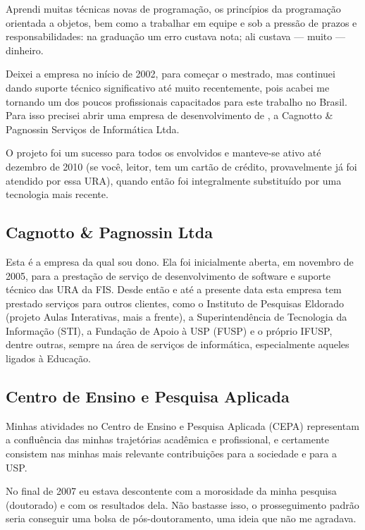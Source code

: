 Aprendi muitas técnicas novas de programação, os princípios da programação orientada a objetos, bem como a trabalhar em equipe e sob a pressão de prazos e responsabilidades: na graduação um erro custava nota; ali custava --- muito --- dinheiro.

Deixei a empresa no início de 2002, para começar o mestrado, mas continuei dando suporte técnico significativo até muito recentemente, pois acabei me tornando um dos poucos profissionais capacitados para este trabalho no Brasil. Para isso precisei abrir uma empresa de desenvolvimento de , a Cagnotto \& Pagnossin Serviços de Informática Ltda.

O projeto foi um sucesso para todos os envolvidos e manteve-se ativo até dezembro de 2010 (se você, leitor, tem um cartão de crédito, provavelmente já foi atendido por essa URA), quando então foi integralmente substituído por uma tecnologia mais recente.

\subsection{Cagnotto \& Pagnossin Ltda}

Esta é a empresa da qual sou dono. Ela foi inicialmente aberta, em novembro de 2005, para a prestação de serviço de desenvolvimento de software e suporte técnico das URA da FIS. Desde então e até a presente data esta empresa tem prestado serviços para outros clientes, como o Instituto de Pesquisas Eldorado (projeto Aulas Interativas, mais a frente), a Superintendência de Tecnologia da Informação (STI), a Fundação de Apoio à USP (FUSP) e o próprio IFUSP, dentre outras, sempre na área de serviços de informática, especialmente aqueles ligados à Educação.

\subsection{Centro de Ensino e Pesquisa Aplicada}
\label{sec:cepa}

Minhas atividades no Centro de Ensino e Pesquisa Aplicada (CEPA) representam a confluência das minhas trajetórias acadêmica e profissional, e certamente consistem nas minhas mais relevante contribuições para a sociedade e para a USP.

No final de 2007 eu estava descontente com a morosidade da minha pesquisa (doutorado) e com os resultados dela. Não bastasse isso, o prosseguimento padrão seria conseguir uma bolsa de pós-doutoramento, uma ideia que não me agradava.

